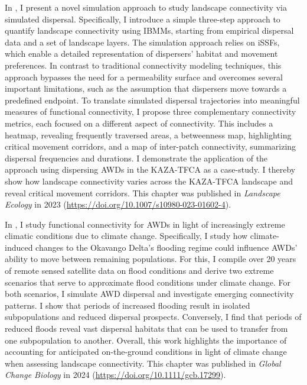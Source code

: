 \documentclass[../FinalThesis.tex]{subfiles}
\begin{document}
In , I present a novel simulation approach to study
landscape connectivity via simulated dispersal. Specifically, I introduce a
simple three-step approach to quantify landscape connectivity using IBMMs,
starting from empirical dispersal data and a set of landscape layers. The
simulation approach relies on iSSFs, which enable a detailed representation of
dispersers' habitat and movement preferences. In contrast to traditional
connectivity modeling techniques, this approach bypasses the need for a
permeability surface and overcomes several important limitations, such as the
assumption that dispersers move towards a predefined endpoint. To translate
simulated dispersal trajectories into meaningful measures of functional
connectivity, I propose three complementary connectivity metrics, each focused
on a different aspect of connectivity. This includes a heatmap, revealing
frequently traversed areas, a betweenness map, highlighting critical movement
corridors, and a map of inter-patch connectivity, summarizing dispersal
frequencies and durations. I demonstrate the application of the approach using
dispersing AWDs in the KAZA-TFCA as a case-study. I thereby show how landscape
connectivity varies across the KAZA-TFCA landscape and reveal critical movement
corridors. This chapter was published in \textit{Landscape Ecology} in 2023
(\url{https://doi.org/10.1007/s10980-023-01602-4}).

In , I study functional connectivity for AWDs in light of
increasingly extreme climatic conditions due to climate change. Specifically, I
study how climate-induced changes to the Okavango Delta's flooding regime could
influence AWDs' ability to move between remaining populations. For this, I
compile over 20 years of remote sensed satellite data on flood conditions and
derive two extreme scenarios that serve to approximate flood conditions under
climate change. For both scenarios, I simulate AWD dispersal and investigate
emerging connectivity patterns. I show that periods of increased flooding result
in isolated subpopulations and reduced dispersal prospects. Conversely, I find
that periods of reduced floods reveal vast dispersal habitats that can be used
to transfer from one subpopulation to another. Overall, this work highlights the
importance of accounting for anticipated on-the-ground conditions in light of
climate change when assessing landscape connectivity. This chapter was published
in \textit{Global Change Biology} in 2024
(\url{https://doi.org/10.1111/gcb.17299}).
\end{document}
